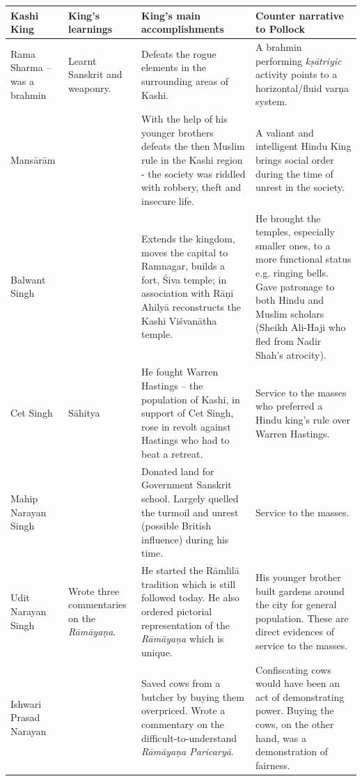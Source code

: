 \begin{longtable}{|p{1.4cm}|p{1.6cm}|p{2.6cm}|p{2.6cm}|}
\hline
Kashi King & King’s learnings & King’s main accomplishments & Counter narrative to Pollock \\
\hline
Rama Sharma – was a brahmin & Learnt Sanskrit and weaponry. & Defeats the rogue elements in the surrounding areas of Kashi. & A brahmin performing \textit{kṣātriyic} activity points to a horizontal/fluid varṇa\index{varna@\textit{varṇa}} system. \\
\hline
Mansārām &   & With the help of his younger brothers defeats the then Muslim rule in the Kashi region - the society was riddled with robbery, theft and insecure life. & A valiant and intelligent Hindu King brings social order during the time of unrest in the society. \\
\hline
Balwant Singh &   & Extends the kingdom, moves the capital to Ramnagar, builds a fort, Śiva temple; in association with Rāṇī Ahilyā reconstructs the Kashi Viśvanātha temple. & He brought the temples, especially smaller ones, to a more functional status e.g. ringing bells. Gave patronage to both Hindu and Muslim scholars (Sheikh Ali-Haji who fled from Nadir Shah’s atrocity). \\
\hline
Cet Singh & Sāhitya & He fought Warren Hastings – the population of Kashi, in support of Cet Singh, rose in revolt against Hastings who had to beat a retreat. & Service to the masses who preferred a Hindu king’s rule over Warren Hastings. \\
\hline
Mahip Narayan Singh &   & Donated land for Government Sanskrit school.\index{Sanskrit schools} Largely quelled the turmoil and unrest (possible British influence) during his time. & Service to the masses. \\
\hline
Udit Narayan Singh & Wrote three commentaries on the \textit{Rāmāyaṇa}.\index{Ramayana@\textit{Rāmāyaṇa}} & He started the Rāmlilā tradition which is still followed today. He also ordered pictorial representation of the \textit{Rāmāyaṇa} which is unique. & His younger brother built gardens around the city for general population. These are direct evidences of service to the masses. \\
\hline
Ishwari Prasad Narayan &   & Saved cows from a butcher by buying them overpriced. Wrote a commentary on the difficult-to-understand \textit{Rāmāyaṇa Paricaryā}.\index{Ramayanaparicarya@\textit{Rāmāyaṇa Paricaryā}} & Confiscating cows would have been an act of demonstrating power. Buying the cows, on the other hand, was a demonstration of fairness. \\
\hline
\end{longtable}


